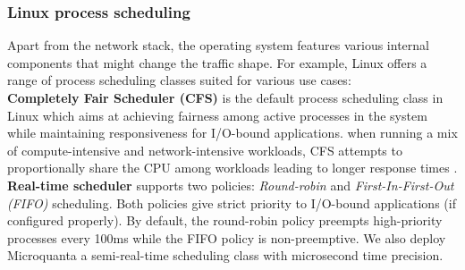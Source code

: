 \subsubsection{Linux process scheduling}
Apart from the network stack, the operating system features various internal components that might change the traffic shape. For example, Linux offers a range of process scheduling classes suited for various use cases:
\\
\textbf{Completely Fair Scheduler (CFS)} is the default process scheduling class in Linux which aims at achieving fairness among active processes in the system while maintaining responsiveness for I/O-bound applications. when running a mix of compute-intensive and network-intensive workloads, CFS attempts to proportionally share the CPU among workloads leading to longer response times \cite{tales}.
\\
\textbf{Real-time scheduler} supports two policies: \textit{Round-robin} and \textit{First-In-First-Out (FIFO)} scheduling. Both policies give strict priority to I/O-bound applications (if configured properly). By default, the round-robin policy preempts high-priority processes every 100ms while the FIFO policy is non-preemptive. We also deploy Microquanta \cite{snap,microquanta} a semi-real-time scheduling class with microsecond time precision.
